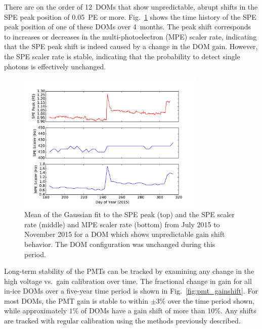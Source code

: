 There are on the order of 12~DOMs that show unpredictable, abrupt shifts in the SPE peak
position of 0.05~PE or more. Fig.~\ref{fig:gainshift_spe} shows the time history of the
SPE peak position of one of these DOMs over 4~months. The peak shift
corresponds to increases or decreases in the multi-photoelectron (MPE) scaler rate,
indicating that the SPE peak shift is indeed caused by a change in the DOM
gain. However, the SPE scaler rate is stable, indicating that the
probability to detect single photons is effectively unchanged.

\begin{figure}[!h]
 \centering
 \includegraphics[width=0.8\textwidth]{graphics/dom/reliability/gainshift.pdf}
 \caption{Mean of the Gaussian fit to the SPE peak (top) and the SPE
   scaler rate (middle) and MPE
   scaler rate (bottom) from July 2015 to November 2015 for a DOM
   which shows unpredictable gain shift behavior. The DOM
   configuration was unchanged during this period.}
 \label{fig:gainshift_spe}
\end{figure}

Long-term stability of the PMTs can be tracked by examining any change in
the high voltage vs.~gain calibration over time.  The fractional change in gain for
all in-ice DOMs over a five-year time period is shown in
Fig.~\ref{fig:pmt_gainshift}.  For most DOMs, the PMT gain is stable to
within $\pm3\%$ over the time period shown, while approximately $1\%$ 
of DOMs have a gain shift of more than 10\%.  Any shifts are tracked with
regular calibration using the methods previously described.

